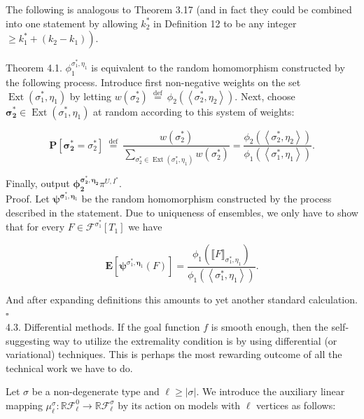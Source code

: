 \documentclass[10pt]{article}
\begin{document}
The following is analogous to Theorem 3.17 (and in fact they could be combined into one statement by allowing $k_{2}^{*}$ in Definition 12 to be any integer $\left.\geq k_{1}^{*}+\left(k_{2}-k_{1}\right)\right)$.

Theorem 4.1. $\phi_{1}^{\sigma_{1}^{*}, \eta_{1}}$ is equivalent to the random homomorphism constructed by the following process. Introduce first non-negative weights on the set $\operatorname{Ext}\left(\sigma_{1}^{*}, \eta_{1}\right)$ by letting $w\left(\sigma_{2}^{*}\right) \stackrel{\text { def }}{=} \phi_{2}\left(\left\langle\sigma_{2}^{*}, \eta_{2}\right\rangle\right)$. Next, choose $\boldsymbol{\sigma}_{\mathbf{2}}^{*} \in \operatorname{Ext}\left(\sigma_{1}^{*}, \eta_{1}\right)$ at random according to this system of weights:

$$
\mathbf{P}\left[\boldsymbol{\sigma}_{\mathbf{2}}^{*}=\sigma_{2}^{*}\right] \stackrel{\text { def }}{=} \frac{w\left(\sigma_{2}^{*}\right)}{\sum_{\sigma_{2}^{*} \in \operatorname{Ext}\left(\sigma_{1}^{*}, \eta_{1}\right)} w\left(\sigma_{2}^{*}\right)}=\frac{\phi_{2}\left(\left\langle\sigma_{2}^{*}, \eta_{2}\right\rangle\right)}{\phi_{1}\left(\left\langle\sigma_{1}^{*}, \eta_{1}\right\rangle\right)} .
$$

Finally, output $\boldsymbol{\phi}_{\mathbf{2}}^{\boldsymbol{\sigma}_{\mathbf{2}}^{*}, \boldsymbol{\eta}_{\mathbf{2}}} \pi^{U, I^{*}}$.\\
Proof. Let $\boldsymbol{\psi}^{\boldsymbol{\sigma}_{1}^{*}, \boldsymbol{\eta}_{1}}$ be the random homomorphism constructed by the process described in the statement. Due to uniqueness of ensembles, we only have to show that for every $F \in \mathcal{F}^{\sigma_{1}^{*}}\left[T_{1}\right]$ we have

$$
\mathbf{E}\left[\boldsymbol{\psi}^{\sigma_{1}^{*}, \boldsymbol{\eta}_{1}}(F)\right]=\frac{\phi_{1}\left(\llbracket F \rrbracket_{\sigma_{1}^{*}, \eta_{1}}\right)}{\phi_{1}\left(\left\langle\sigma_{1}^{*}, \eta_{1}\right\rangle\right)} .
$$

And after expanding definitions this amounts to yet another standard calculation. \(\square\)\\
4.3. Differential methods. If the goal function $f$ is smooth enough, then the self-suggesting way to utilize the extremality condition is by using differential (or variational) techniques. This is perhaps the most rewarding outcome of all the technical work we have to do.

Let $\sigma$ be a non-degenerate type and $\ell \geq|\sigma|$. We introduce the auxiliary linear mapping $\mu_{\ell}^{\sigma}: \mathbb{R} \mathcal{F}_{\ell}^{0} \longrightarrow \mathbb{R} \mathcal{F}_{\ell}^{\sigma}$ by its action on models with $\ell$ vertices as follows:
\end{document}
